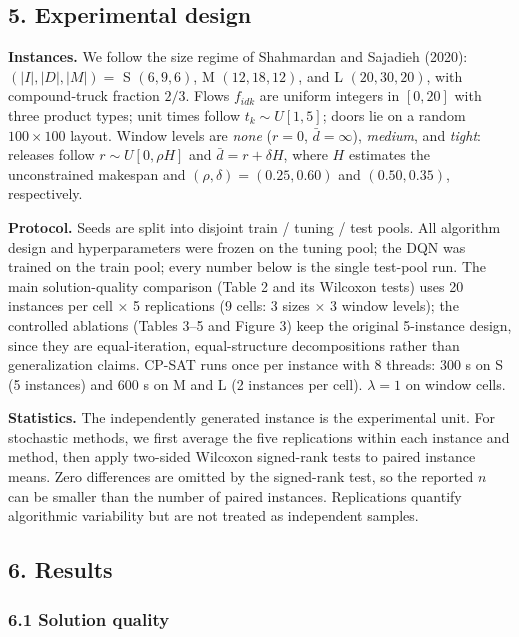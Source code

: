 \documentclass[
]{article}
\newcounter{none} %
\begin{document}
\subsection{5. Experimental design}\label{experimental-design}

\textbf{Instances.} We follow the size regime of Shahmardan and Sajadieh
(2020): \((|I|,|D|,|M|)=\) S \((6,9,6)\), M \((12,18,12)\), and L
\((20,30,20)\), with compound-truck fraction \(2/3\). Flows \(f_{idk}\)
are uniform integers in \([0,20]\) with three product types; unit times
follow \(t_k\sim U[1,5]\); doors lie on a random \(100\times100\)
layout. Window levels are \emph{none} (\(r=0\), \(\bar d=\infty\)),
\emph{medium}, and \emph{tight}: releases follow \(r\sim U[0,\rho H]\)
and \(\bar d=r+\delta H\), where \(H\) estimates the unconstrained
makespan and \((\rho,\delta)=(0.25,0.60)\) and \((0.50,0.35)\),
respectively.

\textbf{Protocol.} Seeds are split into disjoint train / tuning / test
pools. All algorithm design and hyperparameters were frozen on the
tuning pool; the DQN was trained on the train pool; every number below
is the single test-pool run. The main solution-quality comparison (Table
2 and its Wilcoxon tests) uses 20 instances per cell × 5 replications (9
cells: 3 sizes × 3 window levels); the controlled ablations (Tables 3--5
and Figure 3) keep the original 5-instance design, since they are
equal-iteration, equal-structure decompositions rather than generalization
claims. CP-SAT runs once per instance with 8 threads: 300 s on S (5
instances) and 600 s on M and L (2 instances per cell). \(\lambda=1\) on
window cells.

\textbf{Statistics.} The independently generated instance is the
experimental unit. For stochastic methods, we first average the five
replications within each instance and method, then apply two-sided
Wilcoxon signed-rank tests to paired instance means. Zero differences
are omitted by the signed-rank test, so the reported \(n\) can be
smaller than the number of paired instances. Replications quantify
algorithmic variability but are not treated as independent samples.

\subsection{6. Results}\label{results}

\subsubsection{6.1 Solution quality}\label{solution-quality}
\end{document}
